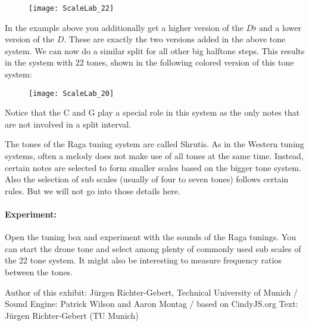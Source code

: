 \begin{figure}[h]
\centering
\texttt{[image: ScaleLab\_22]}
\end{figure}

In the example above you additionally get a higher version of the $D\flat$   and a lower version of the $D$. These are exactly the two versions added in the above tone system. We can now do a similar split for all other big halftone steps. This results in the system with 22 tones, shown in the following colored version of this tone system:

\begin{figure}[h]
\centering
\texttt{[image: ScaleLab\_20]}
\end{figure}

Notice that the C and G play a special role in this system as the only notes that are not involved in a split interval.

The tones of the Raga tuning system are called Shrutis. As in the Western tuning systems, often a melody does not make use of all tones at the same time. Instead, certain notes are selected to form smaller scales based on the bigger tone system. Also the selection of sub scales (usually of four to seven tones) follows certain rules. But we will not go into those details here.

\paragraph{Experiment:} Open the tuning box and experiment with the sounds of the Raga tunings. You can start the drone tone and select among plenty of commonly used sub scales of the 22 tone system. It might also be interesting to measure frequency ratios between the tones.

\vfill

Author of this exhibit: Jürgen Richter-Gebert, Technical University of Munich / Sound Engine: Patrick Wilson and Aaron Montag / based on CindyJS.org
Text: Jürgen Richter-Gebert (TU Munich)


